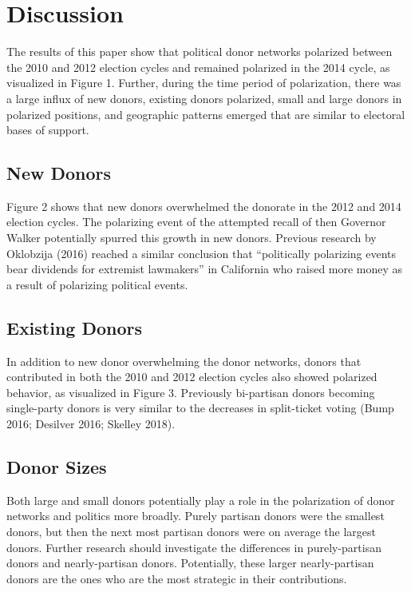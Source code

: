 \documentclass[12pt,]{article}
\begin{document}
\hypertarget{discussion}{%
\section{Discussion}\label{discussion}}

The results of this paper show that political donor networks polarized
between the 2010 and 2012 election cycles and remained polarized in the
2014 cycle, as visualized in Figure 1. Further, during the time period
of polarization, there was a large influx of new donors, existing donors
polarized, small and large donors in polarized positions, and geographic
patterns emerged that are similar to electoral bases of support.

\hypertarget{new-donors}{%
\subsection{New Donors}\label{new-donors}}

Figure 2 shows that new donors overwhelmed the donorate in the 2012 and
2014 election cycles. The polarizing event of the attempted recall of
then Governor Walker potentially spurred this growth in new donors.
Previous research by Oklobzija (2016) reached a similar conclusion that
``politically polarizing events bear dividends for extremist lawmakers''
in California who raised more money as a result of polarizing political
events.

\hypertarget{existing-donors}{%
\subsection{Existing Donors}\label{existing-donors}}

In addition to new donor overwhelming the donor networks, donors that
contributed in both the 2010 and 2012 election cycles also showed
polarized behavior, as visualized in Figure 3. Previously bi-partisan
donors becoming single-party donors is very similar to the decreases in
split-ticket voting (Bump 2016; Desilver 2016; Skelley 2018).

\hypertarget{donor-sizes}{%
\subsection{Donor Sizes}\label{donor-sizes}}

Both large and small donors potentially play a role in the polarization
of donor networks and politics more broadly. Purely partisan donors were
the smallest donors, but then the next most partisan donors were on
average the largest donors. Further research should investigate the
differences in purely-partisan donors and nearly-partisan donors.
Potentially, these larger nearly-partisan donors are the ones who are
the most strategic in their contributions.
\end{document}
